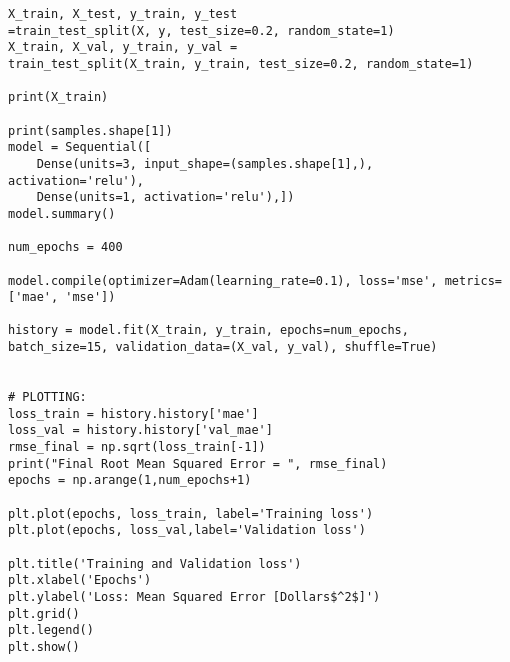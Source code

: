 \documentclass[12pt,a4paper]{article}
\begin{document}
\begin{appendices}
\begin{verbatim}
X_train, X_test, y_train, y_test 
=train_test_split(X, y, test_size=0.2, random_state=1)
X_train, X_val, y_train, y_val =
train_test_split(X_train, y_train, test_size=0.2, random_state=1)

print(X_train)

print(samples.shape[1])
model = Sequential([
    Dense(units=3, input_shape=(samples.shape[1],), activation='relu'),
    Dense(units=1, activation='relu'),])
model.summary()

num_epochs = 400

model.compile(optimizer=Adam(learning_rate=0.1), loss='mse', metrics=['mae', 'mse'])

history = model.fit(X_train, y_train, epochs=num_epochs, batch_size=15, validation_data=(X_val, y_val), shuffle=True)


# PLOTTING:
loss_train = history.history['mae']
loss_val = history.history['val_mae']
rmse_final = np.sqrt(loss_train[-1])
print("Final Root Mean Squared Error = ", rmse_final)
epochs = np.arange(1,num_epochs+1)

plt.plot(epochs, loss_train, label='Training loss')
plt.plot(epochs, loss_val,label='Validation loss')

plt.title('Training and Validation loss')
plt.xlabel('Epochs')
plt.ylabel('Loss: Mean Squared Error [Dollars$^2$]')
plt.grid()
plt.legend()
plt.show()

\end{verbatim}

\end{appendices}
\end{document}
